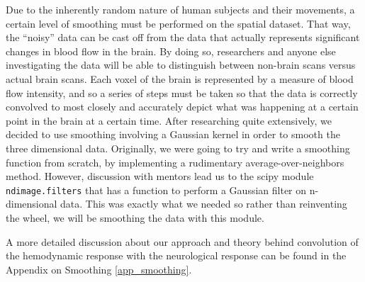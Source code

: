 \par \indent Due to the inherently random nature of human subjects and their 
movements, a certain level of smoothing must be performed on the spatial 
dataset. That way, the ``noisy'' data can be cast off from the data that 
actually represents significant changes in blood flow in the brain. By doing 
so, researchers and anyone else investigating the data will be able to 
distinguish between non-brain scans versus actual brain scans. Each voxel of 
the brain is represented by a measure of blood flow intensity, and so a 
series of steps must be taken so that the data is correctly convolved to most 
closely and accurately depict what was happening at a certain point in the 
brain at a certain time. After researching quite extensively, we decided to 
use smoothing involving a Gaussian kernel in order to smooth the three 
dimensional data. Originally, we were going to try and write a smoothing 
function from scratch, by implementing a rudimentary average-over-neighbors 
method. However, discussion with mentors lead us to the scipy module 
\texttt{ndimage.filters} that has a function to perform a Gaussian filter on 
n-dimensional data. This was exactly what we needed so rather than reinventing 
the wheel, we will be smoothing the data with this module. 

\par \indent A more detailed discussion about our approach and theory behind 
convolution of the hemodynamic response with the neurological response can be
found in the Appendix on Smoothing \ref{app_smoothing}.

